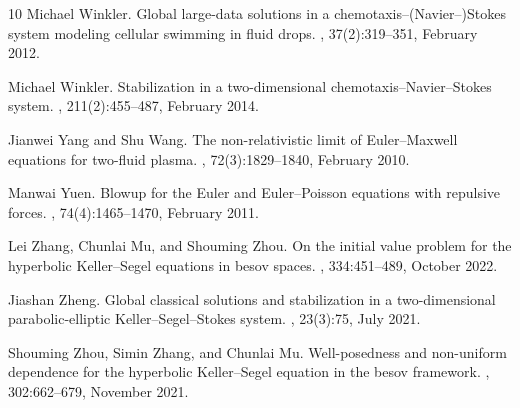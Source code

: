 \documentclass[11pt]{article}
\theoremstyle{plain}
\theoremstyle{definition}
\theoremstyle{remark}
\numberwithin{equation}{section}
\begin{document}
\begin{thebibliography}{10}
Michael Winkler.
\newblock Global large-data solutions in a chemotaxis--(Navier--)Stokes system modeling cellular swimming in fluid drops.
, 37(2):319--351, February 2012.

Michael Winkler.
\newblock Stabilization in a two-dimensional chemotaxis--Navier--Stokes system.
, 211(2):455--487, February 2014.

Jianwei Yang and Shu Wang.
\newblock The non-relativistic limit of Euler--Maxwell equations for two-fluid plasma.
, 72(3):1829--1840, February 2010.

Manwai Yuen.
\newblock Blowup for the Euler and Euler--Poisson equations with repulsive forces.
, 74(4):1465--1470, February 2011.

Lei Zhang, Chunlai Mu, and Shouming Zhou.
\newblock On the initial value problem for the hyperbolic Keller--Segel equations in besov spaces.
, 334:451--489, October 2022.

Jiashan Zheng.
\newblock Global classical solutions and stabilization in a two-dimensional parabolic-elliptic Keller--Segel--Stokes system.
, 23(3):75, July 2021.

Shouming Zhou, Simin Zhang, and Chunlai Mu.
\newblock Well-posedness and non-uniform dependence for the hyperbolic Keller--Segel equation in the besov framework.
, 302:662--679, November 2021.

\end{thebibliography}

% 
% 

\end{document}

